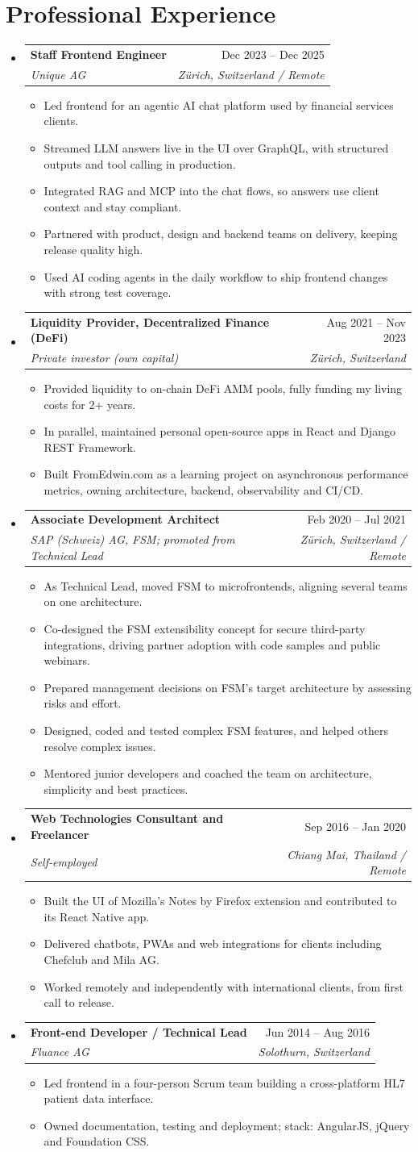 \documentclass[a4paper,11pt]{article}
\makeatletter
\newcommand{\resumeItem}[1]{
  \item\normalsize{
    {#1}
  }
}
\newcommand{\resumeSubheading}[4]{
  \vspace{4pt}\item
    \begin{tabular*}{0.97\textwidth}[t]{l@{\extracolsep{\fill}}r}
      \textbf{#1} & #2 \\
      \textit{\small#3} & \textit{\small #4} \\
    \end{tabular*}\vspace{0pt}
}
\newcommand{\resumeSubHeadingListStart}{\begin{itemize}[leftmargin=0.15in, label={}]}
\newcommand{\resumeSubHeadingListEnd}{\end{itemize}}
\newcommand{\resumeItemListStart}{\begin{itemize}}
\newcommand{\resumeItemListEnd}{\end{itemize}\vspace{2pt}}
\makeatother
\begin{document}
\section{Professional Experience}\resumeSubHeadingListStart
\resumeSubheading{Staff Frontend Engineer}{Dec 2023 -- Dec 2025}{Unique AG}{Zürich, Switzerland / Remote}
\resumeItemListStart
\resumeItem{Led frontend for an agentic AI chat platform used by financial services clients.}
\resumeItem{Streamed LLM answers live in the UI over GraphQL, with structured outputs and tool calling in production.}
\resumeItem{Integrated RAG and MCP into the chat flows, so answers use client context and stay compliant.}
\resumeItem{Partnered with product, design and backend teams on delivery, keeping release quality high.}
\resumeItem{Used AI coding agents in the daily workflow to ship frontend changes with strong test coverage.}
\resumeItemListEnd
\resumeSubheading{Liquidity Provider, Decentralized Finance (DeFi)}{Aug 2021 -- Nov 2023}{Private investor (own capital)}{Zürich, Switzerland}
\resumeItemListStart
\resumeItem{Provided liquidity to on-chain DeFi AMM pools, fully funding my living costs for 2+ years.}
\resumeItem{In parallel, maintained personal open-source apps in React and Django REST Framework.}
\resumeItem{Built FromEdwin.com as a learning project on asynchronous performance metrics, owning architecture, backend, observability and CI/CD.}
\resumeItemListEnd
\resumeSubheading{Associate Development Architect}{Feb 2020 -- Jul 2021}{SAP (Schweiz) AG, FSM; promoted from Technical Lead}{Zürich, Switzerland / Remote}
\resumeItemListStart
\resumeItem{As Technical Lead, moved FSM to microfrontends, aligning several teams on one architecture.}
\resumeItem{Co-designed the FSM extensibility concept for secure third-party integrations, driving partner adoption with code samples and public webinars.}
\resumeItem{Prepared management decisions on FSM's target architecture by assessing risks and effort.}
\resumeItem{Designed, coded and tested complex FSM features, and helped others resolve complex issues.}
\resumeItem{Mentored junior developers and coached the team on architecture, simplicity and best practices.}
\resumeItemListEnd
\resumeSubheading{Web Technologies Consultant and Freelancer}{Sep 2016 -- Jan 2020}{Self-employed}{Chiang Mai, Thailand / Remote}
\resumeItemListStart
\resumeItem{Built the UI of Mozilla's Notes by Firefox extension and contributed to its React Native app.}
\resumeItem{Delivered chatbots, PWAs and web integrations for clients including Chefclub and Mila AG.}
\resumeItem{Worked remotely and independently with international clients, from first call to release.}
\resumeItemListEnd
\resumeSubheading{Front-end Developer / Technical Lead}{Jun 2014 -- Aug 2016}{Fluance AG}{Solothurn, Switzerland}
\resumeItemListStart
\resumeItem{Led frontend in a four-person Scrum team building a cross-platform HL7 patient data interface.}
\resumeItem{Owned documentation, testing and deployment; stack: AngularJS, jQuery and Foundation CSS.}
\resumeItemListEnd
\resumeSubHeadingListEnd
\end{document}
